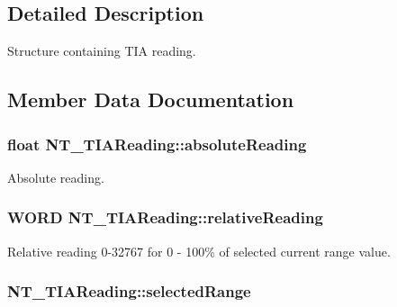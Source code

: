 \subsection{Detailed Description}
Structure containing T\+IA reading. 



\subsection{Member Data Documentation}
\subsubsection[{\texorpdfstring{absolute\+Reading}{absoluteReading}}]{\setlength{\rightskip}{0pt plus 5cm}float N\+T\+\_\+\+T\+I\+A\+Reading\+::absolute\+Reading}\hypertarget{struct_n_t___t_i_a_reading_ac0e14181a77812ec8572ba673579e24a}{}\label{struct_n_t___t_i_a_reading_ac0e14181a77812ec8572ba673579e24a}


Absolute reading. 

\subsubsection[{\texorpdfstring{relative\+Reading}{relativeReading}}]{\setlength{\rightskip}{0pt plus 5cm}W\+O\+RD N\+T\+\_\+\+T\+I\+A\+Reading\+::relative\+Reading}\hypertarget{struct_n_t___t_i_a_reading_a39e53db8dcb7ce3f72bf55a2e82b037c}{}\label{struct_n_t___t_i_a_reading_a39e53db8dcb7ce3f72bf55a2e82b037c}


Relative reading 0-\/32767 for 0 -\/ 100\% of selected current range value. 

\subsubsection[{\texorpdfstring{selected\+Range}{selectedRange}}]{ N\+T\+\_\+\+T\+I\+A\+Reading\+::selected\+Range}\hypertarget{struct_n_t___t_i_a_reading_a738748f2e9f07ad0e1539a1ac374f827}{}\label{struct_n_t___t_i_a_reading_a738748f2e9f07ad0e1539a1ac374f827}


